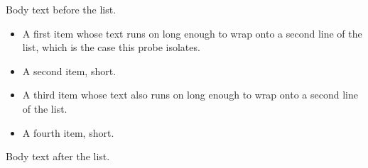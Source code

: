 \documentclass{article}
\begin{document}
Body text before the list.

\begin{itemize}
  \item A first item whose text runs on long enough to wrap onto a second
    line of the list, which is the case this probe isolates.
  \item A second item, short.
  \item A third item whose text also runs on long enough to wrap onto a
    second line of the list.
  \item A fourth item, short.
\end{itemize}

Body text after the list.
\end{document}
